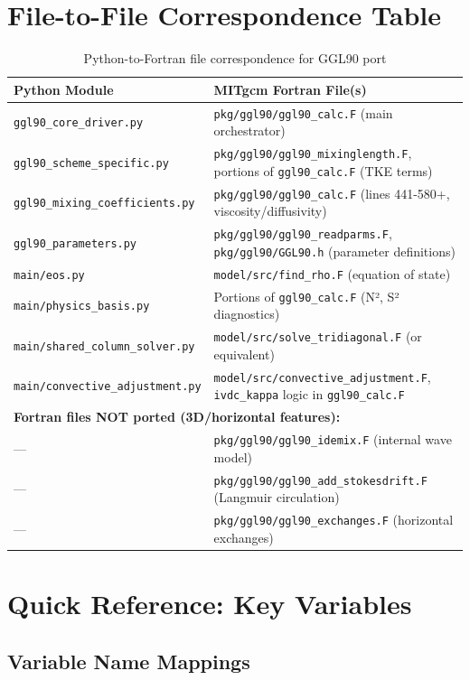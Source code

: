 \documentclass[11pt]{article}
\begin{document}
\section{File-to-File Correspondence Table}
\label{sec:file_correspondence}

\begin{table}[h]
\centering
\begin{tabular}{lp{6cm}}
\toprule
\textbf{Python Module} & \textbf{MITgcm Fortran File(s)} \\
\midrule
\verb|ggl90_core_driver.py| & \verb|pkg/ggl90/ggl90_calc.F| (main orchestrator) \\
\verb|ggl90_scheme_specific.py| & \verb|pkg/ggl90/ggl90_mixinglength.F|, portions of \verb|ggl90_calc.F| (TKE terms) \\
\verb|ggl90_mixing_coefficients.py| & \verb|pkg/ggl90/ggl90_calc.F| (lines 441-580+, viscosity/diffusivity) \\
\verb|ggl90_parameters.py| & \verb|pkg/ggl90/ggl90_readparms.F|, \verb|pkg/ggl90/GGL90.h| (parameter definitions) \\
\verb|main/eos.py| & \verb|model/src/find_rho.F| (equation of state) \\
\verb|main/physics_basis.py| & Portions of \verb|ggl90_calc.F| (N², S² diagnostics) \\
\verb|main/shared_column_solver.py| & \verb|model/src/solve_tridiagonal.F| (or equivalent) \\
\verb|main/convective_adjustment.py| & \verb|model/src/convective_adjustment.F|, \verb|ivdc_kappa| logic in \verb|ggl90_calc.F| \\
\midrule
\multicolumn{2}{l}{\textbf{Fortran files NOT ported (3D/horizontal features):}} \\
— & \verb|pkg/ggl90/ggl90_idemix.F| (internal wave model) \\
— & \verb|pkg/ggl90/ggl90_add_stokesdrift.F| (Langmuir circulation) \\
— & \verb|pkg/ggl90/ggl90_exchanges.F| (horizontal exchanges) \\
\bottomrule
\end{tabular}
\caption{Python-to-Fortran file correspondence for GGL90 port}
\end{table}

\section{Quick Reference: Key Variables}
\label{sec:variables}

\subsection{Variable Name Mappings}
\end{document}
